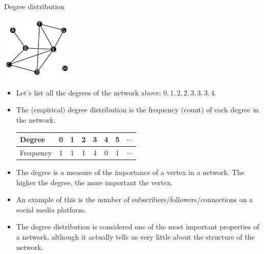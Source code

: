 \documentclass[9pt,handout]{beamer}
\let\olditem\item
\renewcommand{\item}{\olditem\vfill}
\begin{document}
\begin{frame}{Degree distribution}
  \begin{center}
    \includegraphics[width=0.25\textwidth]{week_02_lecture_img_01}
  \end{center}    
  \begin{itemize}
    \item Let's list all the degrees of the network above: $0, 1, 2, 2, 3, 3, 3, 4$.
    \item The (empirical) degree distribution is the frequency (count) of each degree in the network.
    \begin{table}
      \centering
      \begin{tabular}{lccccccc}
        \toprule
        Degree    & 0 & 1 & 2 & 3 & 4 & 5 & $\cdots$\\
        \midrule
        Frequency & 1 & 1 & 1 & 4 & 0 & 1 & $\cdots$\\
        \bottomrule
      \end{tabular}
    \end{table}
    \item The degree is a measure of the importance of a vertex in a network. The higher the degree, the more important the vertex. 
    \item An example of this is the number of subscribers/followers/connections on a social media platform.
    \item The degree distribution is considered one of the most important properties of a network, although it actually tells us very little about the structure of the network.
  \end{itemize}

\end{frame}
\end{document}
